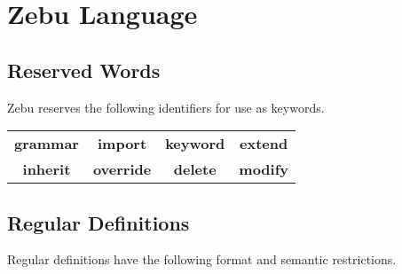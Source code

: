 \documentclass[12pt]{article}
\begin{document}
\section{Zebu Language}

\subsection{Reserved Words}
Zebu reserves the following identifiers for use as keywords.

\begin{center}
\begin{tabular}{c c c c}
\textbf{grammar} & \textbf{import} & \textbf{keyword} & \textbf{extend} \\
\textbf{inherit} & \textbf{override} & \textbf{delete}& \textbf{modify} \\
\end{tabular}
\end{center}

\subsection{Regular Definitions}

Regular definitions have the following format and semantic restrictions.
\end{document}

